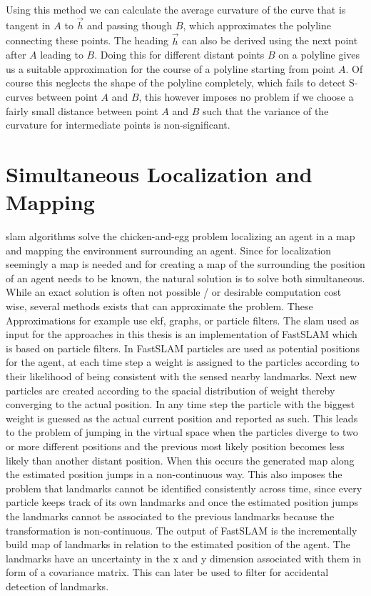 
\vskip 0.2in

Using this method we can calculate the average curvature of the curve that is tangent in $A$ to $\vec h$ and passing though $B$, which approximates the polyline connecting these points. The heading  $\vec h$ can also be derived using the next point after $A$ leading to $B$.
Doing this for different distant points $B$ on a polyline gives us a suitable approximation for the course of a polyline starting from point $A$. Of course this neglects the shape of the polyline completely, which fails to detect S-curves between point $A$ and $B$, this however imposes no problem if we choose a fairly small distance between point $A$ and $B$ such that the variance of the curvature for intermediate points is non-significant.


\section{Simultaneous Localization and Mapping}
\ac{slam} algorithms solve the chicken-and-egg problem localizing an agent in a map and mapping the environment surrounding an agent. Since for localization seemingly a map is needed and for creating a map of the surrounding the position of an agent needs to be known, the natural solution is to solve both simultaneous. While an exact solution is often not possible / or desirable computation cost wise, several methods exists that can approximate the problem. These Approximations for example use \ac{ekf}, graphs, or particle filters. The \ac{slam} used as input for the approaches in this thesis is an implementation of FastSLAM \cite{FastSLAM2002} which is based on particle filters. In FastSLAM particles are used as potential positions for the agent, at each time step a weight is assigned to the particles according to their likelihood of being consistent with the sensed nearby landmarks. Next new particles are created according to the spacial distribution of weight thereby converging to the actual position. In any time step the particle with the biggest weight is guessed as the actual current position and reported as such. This leads to the problem of jumping in the virtual space when the particles diverge to two or more different positions and the previous most likely position becomes less likely than another distant position. When this occurs the generated map along the estimated position jumps in a non-continuous way. This also imposes the problem that landmarks cannot be identified consistently across time, since every particle keeps track of its own landmarks and once the estimated position jumps the landmarks cannot be associated to the previous landmarks because the transformation is non-continuous. The output of FastSLAM is the incrementally build map of landmarks in relation to the estimated position of the agent. The landmarks have an uncertainty in the x and y dimension associated with them in form of a covariance matrix. This can later be used to filter for accidental detection of landmarks.

